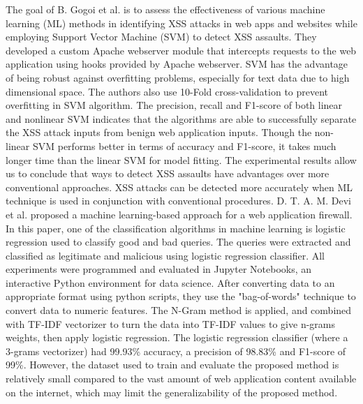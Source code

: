 The goal of B. Gogoi et al. \cite{Gogoi} is to assess the effectiveness of various machine learning (ML) methods in identifying XSS attacks in web apps and websites while employing Support Vector Machine (SVM) to detect XSS assaults. They developed a custom Apache webserver module that intercepts requests to the web application using hooks provided by Apache webserver. SVM has the advantage of being robust against overfitting problems, especially for text data due to high dimensional space. The authors also use 10-Fold cross-validation to prevent overfitting in SVM algorithm. The precision, recall and F1-score of both linear and nonlinear SVM indicates that the algorithms are able to successfully separate the XSS attack inputs from benign web application inputs.  Though the non-linear SVM performs better in terms of accuracy and F1-score, it takes much longer time than the linear SVM for model fitting. The experimental results allow us to conclude that ways to detect XSS assaults have advantages over more conventional approaches. XSS attacks can be detected more accurately when ML technique is used in conjunction with conventional procedures. 
\newpage
D. T. A. M. Devi et al. \cite{Devi} proposed a machine learning-based approach for a web application firewall. In this paper, one of the classification algorithms in machine learning is logistic regression used to classify good and bad queries. The queries were extracted and classified as legitimate and malicious using logistic regression classifier. All experiments were programmed and evaluated in
Jupyter Notebooks, an interactive Python environment for data science. After converting data to an appropriate format using python scripts, they use the "bag-of-words" technique to convert data to numeric features. The N-Gram method is applied, and combined with TF-IDF vectorizer to turn the data into TF-IDF values to give n-grams weights, then apply logistic regression. The logistic regression classifier (where a 3-grams vectorizer) had 99.93\% accuracy, a precision of 98.83\% and F1-score of 99\%. However, the dataset used to train and evaluate the proposed method is relatively small compared to the vast amount of web application content available on the internet, which may limit the generalizability of the proposed method.

